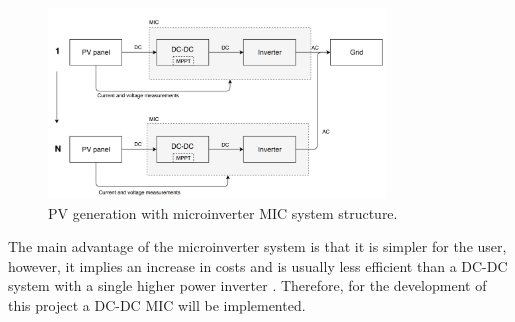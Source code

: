 \begin{figure}[H]
	\begin{center}
	\includegraphics[width=0.8\textwidth]{../Pictures/MIC_microinverter}
		\caption{PV generation with microinverter MIC system structure.}
		\label{microinverter_system}
	\end{center}	
\end{figure}

The main advantage of the microinverter system is that it is simpler for the user, however, it implies an increase in costs and is usually less efficient than a DC-DC system with a single higher power inverter \cite{ArchitectureMIC}. Therefore, for the development of this project a DC-DC MIC will be implemented.